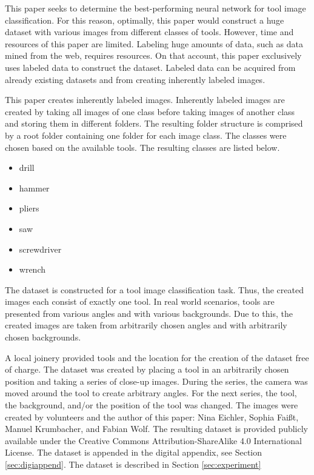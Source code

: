 This paper seeks to determine the best-performing neural network for tool image classification. For this reason, optimally, this paper would construct a huge dataset with various images from different classes of tools.\autocites{Howard.2013}{cifar.2012}{imagenet.2019}  
However, time and resources of this paper are limited. Labeling huge amounts of data, such as data mined from the web, requires resources. On that account, this paper exclusively uses labeled data to construct the dataset. Labeled data can be acquired from already existing datasets and from creating inherently labeled images.
\par
This paper creates inherently labeled images. Inherently labeled images are created by taking all images of one class before taking images of another class and storing them in different folders. The resulting folder structure is comprised by a root folder containing one folder for each image class. The classes were chosen based on the available tools. The resulting classes are listed below.
\begin{itemize}
	\item drill
	\item hammer
	\item pliers
	\item saw
	\item screwdriver
	\item wrench
\end{itemize}
The dataset is constructed for a tool image classification task. Thus, the created images each consist of exactly one tool. In real world scenarios, tools are presented from various angles and with various backgrounds. Due to this, the created images are taken from arbitrarily chosen angles and with arbitrarily chosen backgrounds. 
\par
A local joinery provided tools and the location for the creation of the dataset free of charge. The dataset was created by placing a tool in an arbitrarily chosen position and taking a series of close-up images. During the series, the camera was moved around the tool to create arbitrary angles. For the next series, the tool, the background, and/or the position of the tool was changed. 
The images were created by volunteers and the author of this paper: Nina Eichler, Sophia Fai{\ss}t, Manuel Krumbacher, and Fabian Wolf. 
The resulting dataset is provided publicly available under the Creative Commons Attribution-ShareAlike 4.0 International License. The dataset is appended in the digital appendix, see Section \ref{sec:digiappend}. The dataset is described in Section \ref{sec:experiment}